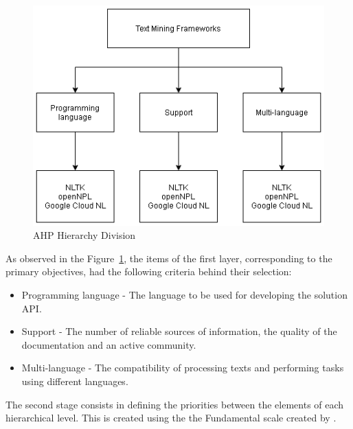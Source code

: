 \begin{figure}[H]
\centering
\includegraphics[scale=0.5]{ch2/assets/AHP.png}
\caption[AHP Hierarchy Division]{AHP Hierarchy Division}
\label{fig:AHP}
\end{figure}

As observed in the Figure~\ref{fig:AHP}, the items of the first layer, corresponding to the primary objectives, had the following criteria behind their selection:

\begin{itemize}
    \item Programming language - The language to be used for developing the solution \gls{API}.
    \item Support - The number of reliable sources of information, the quality of the documentation and an active community.
    \item Multi-language - The compatibility of processing texts and performing tasks using different languages. 
\end{itemize}

The second stage consists in defining the priorities between the elements of each hierarchical level.
This is created using the the Fundamental scale created by \textcite{saaty_1987}.

